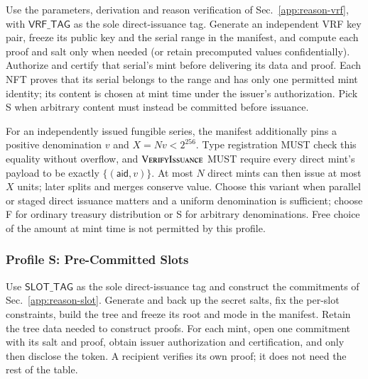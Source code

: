 Use the parameters, derivation and reason verification of Sec.~\ref{app:reason-vrf}, with $\mathsf{VRF\_TAG}$ as the sole direct-issuance tag. Generate an independent VRF key pair, freeze its public key and the serial range in the manifest, and compute each proof and salt only when needed (or retain precomputed values confidentially). Authorize and certify that serial's mint before delivering its data and proof. Each NFT proves that its serial belongs to the range and has only one permitted mint identity; its content is chosen at mint time under the issuer's authorization. Pick S when arbitrary content must instead be committed before issuance.

For an independently issued fungible series, the manifest additionally pins a positive denomination $v$ and $X=Nv<2^{256}$. Type registration MUST check this equality without overflow, and $\Call{VerifyIssuance}{}$ MUST require every direct mint's payload to be exactly $\{(\mathsf{aid},v)\}$. At most $N$ direct mints can then issue at most $X$ units; later splits and merges conserve value. Choose this variant when parallel or staged direct issuance matters and a uniform denomination is sufficient; choose F for ordinary treasury distribution or S for arbitrary denominations. Free choice of the amount at mint time is not permitted by this profile.

\subsubsection{Profile S: Pre-Committed Slots}\label{app:uts-slots}

Use $\mathsf{SLOT\_TAG}$ as the sole direct-issuance tag and construct the commitments of Sec.~\ref{app:reason-slot}. Generate and back up the secret salts, fix the per-slot constraints, build the tree and freeze its root and mode in the manifest. Retain the tree data needed to construct proofs. For each mint, open one commitment with its salt and proof, obtain issuer authorization and certification, and only then disclose the token. A recipient verifies its own proof; it does not need the rest of the table.

